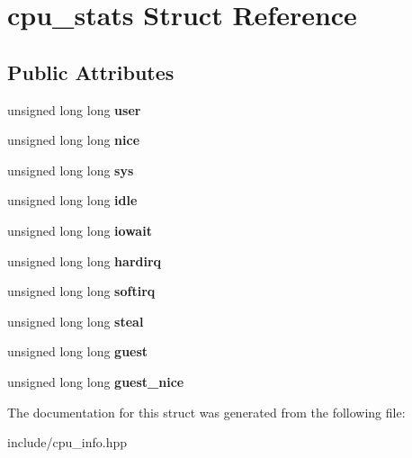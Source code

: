 \hypertarget{structcpu__stats}{}\section{cpu\+\_\+stats Struct Reference}
\label{structcpu__stats}
\subsection*{Public Attributes}
\begin{DoxyCompactItemize}
\item 
\mbox{\label{structcpu__stats_a4cef1219090e0cef461feb79c36433c2}} 
unsigned long long {\bfseries user}
\item 
\mbox{\label{structcpu__stats_a8802f4c22582c1059822065d22f87acd}} 
unsigned long long {\bfseries nice}
\item 
\mbox{\label{structcpu__stats_a1bcc21b0947acd81f44c4e2a44a26011}} 
unsigned long long {\bfseries sys}
\item 
\mbox{\label{structcpu__stats_a7a9f3351d08851260461e1b044a1d1e0}} 
unsigned long long {\bfseries idle}
\item 
\mbox{\label{structcpu__stats_a3327e797efe86a074e00cf4394a2bdee}} 
unsigned long long {\bfseries iowait}
\item 
\mbox{\label{structcpu__stats_a96d667d6fa9e82d6e37c2cf82f3cab5b}} 
unsigned long long {\bfseries hardirq}
\item 
\mbox{\label{structcpu__stats_a6c22b3ca51afd8c46371889b848871d6}} 
unsigned long long {\bfseries softirq}
\item 
\mbox{\label{structcpu__stats_ae51882fddeac98d310b5429ed8a7b83c}} 
unsigned long long {\bfseries steal}
\item 
\mbox{\label{structcpu__stats_a5a26a2b8b7059d77dcb505ecc457b093}} 
unsigned long long {\bfseries guest}
\item 
\mbox{\label{structcpu__stats_a335b7874ea56a05625a11ce7d2a0000b}} 
unsigned long long {\bfseries guest\+\_\+nice}
\end{DoxyCompactItemize}


The documentation for this struct was generated from the following file\+:\begin{DoxyCompactItemize}
\item 
include/cpu\+\_\+info.\+hpp\end{DoxyCompactItemize}
